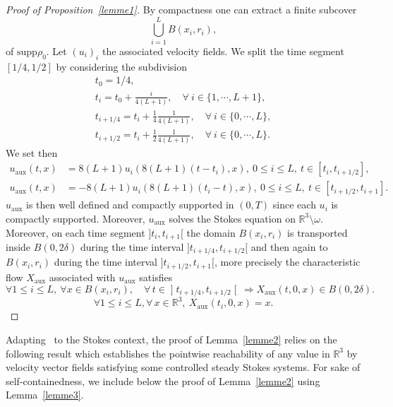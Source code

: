 \documentclass[AHL,Unicode,longabstracts,published]{cedram}
\newcommand{\supp}{\mathrm{supp} }
\newcommand{\aux}{\mathrm{aux}}
\newcommand{\R}{\mathbb{R}}
\renewcommand{\leq}{\leqslant}
\let\oldforall\forall
\renewcommand*{\forall}{\mathrel{\oldforall}}
\begin{document}
\begin{proof}[Proof of Proposition~\ref{lemme1}]
By compactness one can extract a finite subcover
\[
\underset{i=1}{\overset{L}{\bigcup}}B(x_i,r_i),
\]
of $\supp \rho_0$. Let $(u_i)_i$ the associated velocity fields. We split the time segment $[1/4,1/2]$ by considering the subdivision
\begin{gather*}
t_0=1/4, \\
t_i=t_0+ \frac{i}{4(L+1)}, \quad \forall\: i \in \{1, \cdots, L+1\},\\
t_{i+1/4}=t_i +\frac{1}{4} \frac{1}{4(L+1)}, \quad \forall\: i \in \{0, \cdots, L\}, \\
t_{i+1/2}=t_i +\frac{1}{2} \frac{1}{4(L+1)},\quad \forall\: i \in \{0, \cdots, L\}.
\end{gather*}
We set then
\begin{align*}
u_\aux(t,x)&=8(L+1)u_i(8(L+1)(t-t_{i}),x), \: 0 \leq i \leq L, \: t \in [t_{i},t_{i+1/2}],
\\ u_\aux(t,x)&=-8(L+1)u_i(8(L+1)(t_{i}-t),x), \: 0 \leq i \leq L, \: t \in [t_{i+1/2},t_{i+1}].
\end{align*}
$u_\aux$ is then well defined and compactly supported in $(0,T)$ since each $u_i$ is compactly supported. Moreover, $u_\aux$ solves the Stokes equation on $\R^3 \setminus \omega$. Moreover, on each time segment $]t_{i},t_{i+1}[$ the domain $B(x_i,r_i)$ is transported inside $B(0,2\delta)$ during the time interval $]t_{i+1/4},t_{i+1/2}[$ and then again to $B(x_i,r_i)$ during the time interval $]t_{i+1/2},t_{i+1}[$, more precisely the characteristic flow $X_\aux$ associated with $u_\aux$ satisfies
\begin{equation*}
\forall 1 \leq i \leq L,\: \forall x\in B(x_i, r_i), \quad \forall \, t \in\mathopen]t_{i+1/4},t_{i+1/2}\mathclose[\,\Rightarrow X_\aux(t,0,x)\in B(0,2\delta).
\end{equation*}
\[
\forall 1 \leq i \leq L,\forall \, x \in \R^3, \: X_\aux(t_{i},0,x)=x.
\]
\end{proof}



Adapting~\cite[Proposition~3.2.8]{G} to the Stokes context, the proof of Lemma~\ref{lemme2} relies on the following result which establishes the pointwise reachability of any value in $\R^3$ by velocity vector fields satisfying some controlled steady Stokes systems. For sake of self-containedness, we include below the proof of Lemma~\ref{lemme2} using Lemma~\ref{lemme3}.
\end{document}
